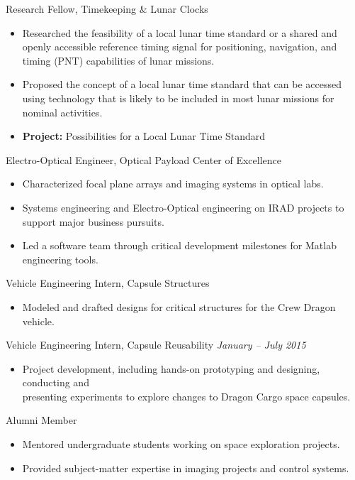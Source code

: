 \documentclass[10pt,final,sans]{resume}
\begin{document}
Research Fellow, Timekeeping \& Lunar Clocks
\begin{itemize}
    \item Researched the feasibility of a local lunar time standard or a shared and openly accessible reference timing signal for positioning, navigation, and timing (PNT) capabilities of lunar missions.
    \item Proposed the concept of a local lunar time standard that can be accessed using technology that is likely to be included in most lunar missions for nominal activities.
    \item {\bf Project:} Possibilities for a Local Lunar Time Standard
\end{itemize}

Electro-Optical Engineer, Optical Payload Center of Excellence
\begin{itemize}
  \item Characterized focal plane arrays and imaging systems in optical labs.
  \item Systems engineering and Electro-Optical engineering on IRAD projects to
  support major business pursuits.
  \item Led a software team through critical development milestones for Matlab
  engineering tools.
\end{itemize}
Vehicle Engineering Intern, Capsule Structures
\begin{itemize}
  \item Modeled and drafted designs for critical structures for the Crew Dragon
  vehicle.
\end{itemize}

Vehicle Engineering Intern, Capsule Reusability \hfill {\it January -- July 2015}
\begin{itemize}
  \item Project development, including hands-on prototyping and designing,
  conducting and \\
  presenting experiments to explore changes to Dragon Cargo space capsules.
\end{itemize}

Alumni Member
\begin{itemize}
  \item Mentored undergraduate students working on space exploration projects.
  \item Provided subject-matter expertise in imaging projects and control systems.
\end{itemize}
\end{document}

